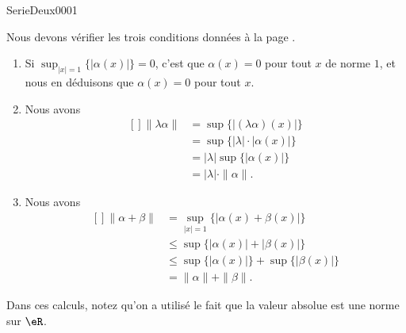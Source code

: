 
\begin{corrige}{SerieDeux0001}

	Nous devons vérifier les trois conditions données à la page \pageref{PgDefNorme}.
	\begin{enumerate}

		\item
			Si $\sup_{| x |=1}\{ |\alpha(x)| \}=0$, c'est que $\alpha(x)=0$ pour tout $x$ de norme $1$, et nous en déduisons que $\alpha(x)=0$ pour tout $x$.
		\item
			Nous avons
			\begin{equation}
				\begin{aligned}[]
					\| \lambda\alpha \|&=\sup\{ | (\lambda\alpha)(x) | \}\\
					&=\sup\{ | \lambda |\cdot| \alpha(x) | \}\\
					&=| \lambda |\sup\{ | \alpha(x) | \}\\
					&=| \lambda |\cdot\| \alpha \|.
				\end{aligned}
			\end{equation}
		\item
			Nous avons
			\begin{equation}
				\begin{aligned}[]
					\| \alpha+\beta \|&=\sup_{| x |=1}\{ | \alpha(x)+\beta(x) | \}\\
					&\leq\sup \{ | \alpha(x) |+| \beta(x) | \}\\
					&\leq \sup\{ | \alpha(x) | \}+\sup\{ | \beta(x) | \}\\
					&=\| \alpha \|+\| \beta \|.
				\end{aligned}
			\end{equation}

	\end{enumerate}
	Dans ces calculs, notez qu'on a utilisé le fait que la valeur absolue est une norme sur $\eR$.

\end{corrige}

